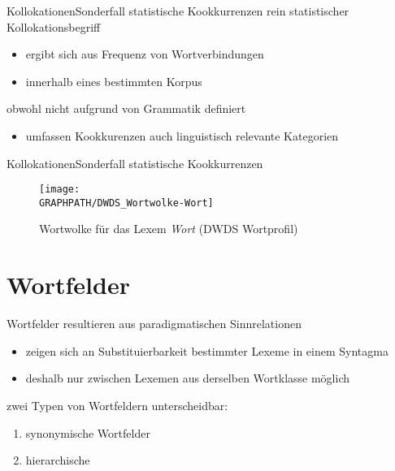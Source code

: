 \begin{frame}{Kollokationen}{Sonderfall statistische Kookkurrenzen}
\onslide<+->
rein statistischer Kollokationsbegriff
\begin{itemize}[<+->]
	\item		ergibt sich aus Frequenz von Wortverbindungen
	\item		innerhalb eines bestimmten Korpus
\end{itemize}
\onslide<+->
\Zeile
obwohl nicht aufgrund von Grammatik definiert
\begin{itemize}[<+->]
	\item		umfassen Kookkurenzen auch linguistisch relevante Kategorien
\end{itemize}
\end{frame}

\begin{frame}{Kollokationen}{Sonderfall statistische Kookkurrenzen}
\center
\begin{figure}
\texttt{[image: \\GRAPHPATH/DWDS\_Wortwolke-Wort]}
\caption{Wortwolke für das Lexem \textit{Wort} (DWDS Wortprofil)}
\end{figure}
\end{frame}

\section{Wortfelder}

\begin{frame}{Wortfelder}
\onslide<+->
resultieren aus paradigmatischen Sinnrelationen
\Halbzeile
\begin{itemize}[<+->]
	\item		zeigen sich an Substituierbarkeit bestimmter Lexeme in einem Syntagma
	\item		deshalb nur zwischen Lexemen aus derselben Wortklasse möglich
\end{itemize}
\onslide<+->
\Zeile
zwei Typen von Wortfeldern unterscheidbar:
\Halbzeile
\begin{enumerate}[<+->]
	\item		synonymische Wortfelder
	\item		hierarchische
\end{enumerate}
\end{frame}

